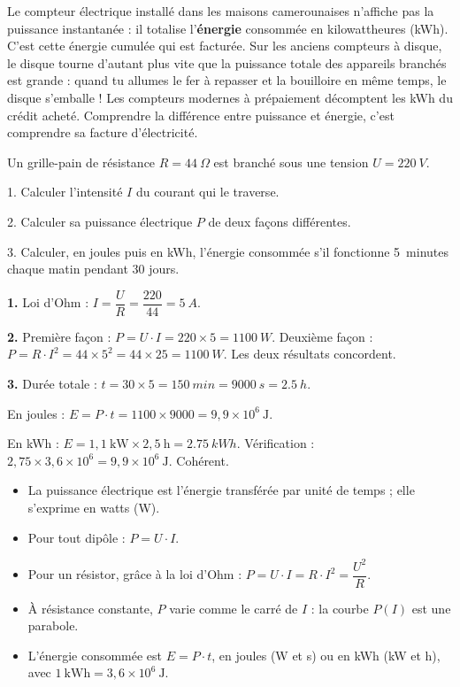 \documentclass[11pt]{article}
\begin{document}
\begin{savaistu}
Le compteur électrique installé dans les maisons camerounaises n'affiche pas la puissance instantanée : il totalise l'\textbf{énergie} consommée en kilowattheures (kWh). C'est cette énergie cumulée qui est facturée. Sur les anciens compteurs à disque, le disque tourne d'autant plus vite que la puissance totale des appareils branchés est grande : quand tu allumes le fer à repasser et la bouilloire en même temps, le disque s'emballe ! Les compteurs modernes à prépaiement décomptent les kWh du crédit acheté. Comprendre la différence entre puissance et énergie, c'est comprendre sa facture d'électricité.
\end{savaistu}

\begin{exercice}
Un grille-pain de résistance $R = \SI{44}{\Omega}$ est branché sous une tension $U = \SI{220}{V}$.\par
1. Calculer l'intensité $I$ du courant qui le traverse.\par
2. Calculer sa puissance électrique $P$ de deux façons différentes.\par
3. Calculer, en joules puis en kWh, l'énergie consommée s'il fonctionne \SI{5}{minutes} chaque matin pendant 30 jours.
\end{exercice}

\begin{corrige}
\textbf{1.} Loi d'Ohm : $I = \dfrac{U}{R} = \dfrac{220}{44} = \SI{5}{A}$.\par
\textbf{2.} Première façon : $P = U \cdot I = 220 \times 5 = \SI{1100}{W}$. Deuxième façon : $P = R \cdot I^2 = 44 \times 5^2 = 44 \times 25 = \SI{1100}{W}$. Les deux résultats concordent.\par
\textbf{3.} Durée totale : $t = 30 \times 5 = \SI{150}{min} = \SI{9000}{s} = \SI{2,5}{h}$.\par
En joules : $E = P \cdot t = 1100 \times 9000 = 9,9 \times 10^{6}~\text{J}$.\par
En kWh : $E = 1,1~\text{kW} \times 2,5~\text{h} = \SI{2,75}{kWh}$. Vérification : $2,75 \times 3,6 \times 10^{6} = 9,9 \times 10^{6}~\text{J}$. Cohérent.
\end{corrige}

\begin{aretenir}
\begin{itemize}
\item La puissance électrique est l'énergie transférée par unité de temps ; elle s'exprime en watts (W).
\item Pour tout dipôle : $P = U \cdot I$.
\item Pour un résistor, grâce à la loi d'Ohm : $P = U \cdot I = R \cdot I^2 = \dfrac{U^2}{R}$.
\item À résistance constante, $P$ varie comme le carré de $I$ : la courbe $P(I)$ est une parabole.
\item L'énergie consommée est $E = P \cdot t$, en joules (W et s) ou en kWh (kW et h), avec $1~\text{kWh} = 3,6 \times 10^{6}~\text{J}$.
\end{itemize}
\end{aretenir}
\end{document}
